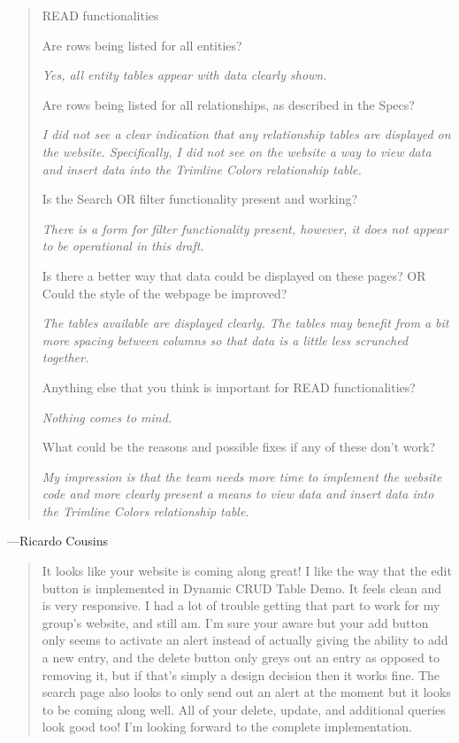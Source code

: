 \documentclass[11pt,letterpaper,oneside]{amsart}
\begin{document}
\begin{quotation}
READ functionalities

Are rows being listed for all entities?

\emph{Yes, all entity tables appear with data clearly shown.}

Are rows being listed for all relationships, as described in the Specs?

\emph{I did not see a clear indication that any relationship tables are displayed on the website. Specifically, I did not see on the website a way to view data and insert data into the Trimline Colors relationship table.}

Is the Search OR filter functionality present and working?

\emph{There is a form for filter functionality present, however, it does not appear to be operational in this draft.}

Is there a better way that data could be displayed on these pages? OR Could the style of the webpage be improved?

\emph{The tables available are displayed clearly. The tables may benefit from a bit more spacing between columns so that data is a little less scrunched together.}

Anything else that you think is important for READ functionalities?

\emph{Nothing comes to mind.}

What could be the reasons and possible fixes if any of these don't work?

\emph{My impression is that the team needs more time to implement the website code and more clearly present a means to view data and insert data into the Trimline Colors relationship table.}

\end{quotation}
---Ricardo Cousins



\begin{quotation}

It looks like your website is coming along great! I like the way that the edit button is implemented in Dynamic CRUD Table Demo. It feels clean and is very responsive. I had a lot of trouble getting that part to work for my group's website, and still am. I'm sure your aware but your add button only seems to activate an alert instead of actually giving the ability to add a new entry, and the delete button only greys out an entry as opposed to removing it, but if that's simply a design decision then it works fine. The search page also looks to only send out an alert at the moment but it looks to be coming along well. All of your delete, update, and additional queries look good too! I'm looking forward to the complete implementation.

\end{quotation}
\end{document}
